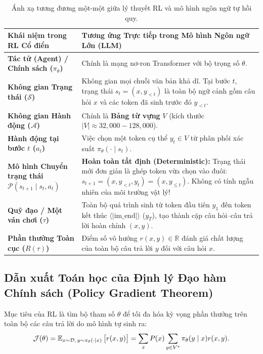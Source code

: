\begin{table}[h!]
\centering
\small
\renewcommand{\arraystretch}{1.3}
\begin{tabularx}{\textwidth}{>{\bfseries}p{3.5cm} X}
\toprule
Khái niệm trong RL Cổ điển & Tương ứng Trực tiếp trong Mô hình Ngôn ngữ Lớn (LLM) \\
\midrule
Tác tử (Agent) / Chính sách ($\pi_\theta$) & Chính là mạng nơ-ron Transformer với bộ trọng số $\theta$. \\
Không gian Trạng thái ($\mathcal{S}$) & Không gian mọi chuỗi văn bản khả dĩ. Tại bước $t$, trạng thái $s_t = (x, y_{<t})$ là toàn bộ ngữ cảnh gồm câu hỏi $x$ và các token đã sinh trước đó $y_{<t}$. \\
Không gian Hành động ($\mathcal{A}$) & Chính là \textbf{Bảng từ vựng} $V$ (kích thước $|V| \approx 32,000 - 128,000$). \\
Hành động tại bước $t$ ($a_t$) & Việc chọn một token cụ thể $y_t \in V$ từ phân phối xác suất $\pi_\theta(\cdot \mid s_t)$. \\
Mô hình Chuyển trạng thái $\mathcal{P}(s_{t+1} \mid s_t, a_t)$ & \textbf{Hoàn toàn tất định (Deterministic):} Trạng thái mới đơn giản là ghép token vừa chọn vào đuôi: $s_{t+1} = (x, y_{<t}, y_t) = (x, y_{\le t})$. Không có tính ngẫu nhiên của môi trường vật lý! \\
Quỹ đạo / Một ván chơi ($\tau$) & Toàn bộ quá trình sinh từ token đầu tiên $y_1$ đến token kết thúc $\langle|\text{im\_end}|\rangle$ ($y_T$), tạo thành cặp câu hỏi--câu trả lời hoàn chỉnh $(x, y)$. \\
Phần thưởng Toàn cục ($R(\tau)$) & Điểm số vô hướng $r(x, y) \in \mathbb{R}$ đánh giá chất lượng của toàn bộ câu trả lời $y$ đối với câu hỏi $x$. \\
\bottomrule
\end{tabularx}
\caption{Ánh xạ tương đương một-một giữa lý thuyết RL và mô hình ngôn ngữ tự hồi quy.}
\label{tab:rl_llm_mapping}
\end{table}

\subsection{Dẫn xuất Toán học của Định lý Đạo hàm Chính sách (Policy Gradient Theorem)}
Mục tiêu của RL là tìm bộ tham số $\theta$ để tối đa hóa kỳ vọng phần thưởng trên toàn bộ các câu trả lời do mô hình tự sinh ra:
\begin{equation}
    \mathcal{J}(\theta) = \operatorname{\mathbb{E}}_{x \sim \mathcal{D}, \, y \sim \pi_\theta(\cdot \mid x)} \big[ r(x, y) \big] = \sum_{x} P(x) \sum_{y \in V^*} \pi_\theta(y \mid x) r(x, y).
    \label{eq:rl_objective}
\end{equation}

